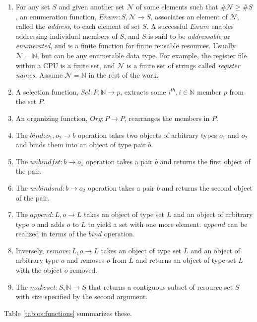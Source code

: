 \documentclass[draft]{article}
\begin{document}
\begin{enumerate}
\item  For any set  $S$ and  given another  set $\mathcal{N}$  of some
  elements such that $\#\mathcal{N} \ge \#S$, an enumeration function,
  $Enum:  S,  \mathcal{N} \rightarrow  S$,  associates  an element  of
  $\mathcal{N}$,  called the  \emph{address}, to  each element  of set
  $S$.  A  successful $Enum$ enables addressing  individual members of
  $S$, and $S$ is  said to be \emph{addressable} or \emph{enumerated},
  and  is a finite  function for  finite reusable  resources.  Usually
  $\mathcal{N}  = \mathbb{N}$, but  can be  any enumerable  data type.
  For example,  the register file  within a CPU  is a finite  set, and
  $\mathcal{N}$  is  a finite  set  of  strings called  \emph{register
    names}.   Assume $\mathcal{N}  = \mathbb{N}$  in the  rest  of the
  work.
\item  A selection  function,  $Sel :  P,  \mathbb{N} \rightarrow  p$,
  extracts some  $i^{th}, i  \in \mathbb{N}$ member  $p$ from  the set
  $P$.
\item An organizing function, $Org  : P \rightarrow P$, rearranges the
  members in $P$.   
\item The $bind: o_1,o_2 \rightarrow b$ operation takes two objects of
  arbitrary types  $o_1$ and  $o_2$ and binds  them into an  object of
  type pair $b$.
\item The  $unbindfst: b \rightarrow  o_1$ operation takes a  pair $b$
  and returns the first object of the pair.
\item The  $unbindsnd: b \rightarrow  o_2$ operation takes a  pair $b$
  and returns the second object of the pair.
\item The $append: L,o \rightarrow L$  takes an object of type set $L$
  and an object of  arbitrary type $o$ and adds $o$ to  $L$ to yield a
  set with one more element.  $append$ can be realized in terms of the
  $bind$ operation.
\item Inversely, $remove:  L,o \rightarrow L$ takes an  object of type
  set $L$ and an object of arbitrary type $o$ and removes $o$ from $L$
  and returns an object of type set $L$ with the object $o$ removed.
\item  The  $makeset: S,  \mathbb{N}  \rightarrow  S$  that returns  a
  contiguous subset  of resource  set $S$ with  size specified  by the
  second argument.
\end{enumerate}
Table \ref{tab:os:functions} summarizes these.
\end{document}
